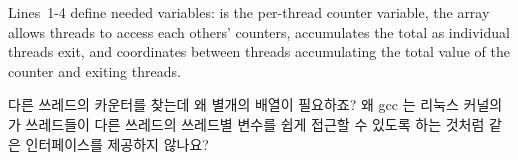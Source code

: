 Lines~1-4 define needed variables:  is the per-thread counter
variable, the  array allows threads to access each others'
counters,  accumulates the total as individual threads exit,
and  coordinates between threads accumulating the total
value of the counter and exiting threads.
\fi

\QuickQuiz{}
	다른 쓰레드의 카운터를 찾는데 왜 별개의 배열이 필요하죠?
	왜 gcc 는 리눅스 커널의  가 쓰레드들이 다른 쓰레드의
	쓰레드별 변수를 쉽게 접근할 수 있도록 하는 것처럼 
	같은 인터페이스를 제공하지 않나요?

